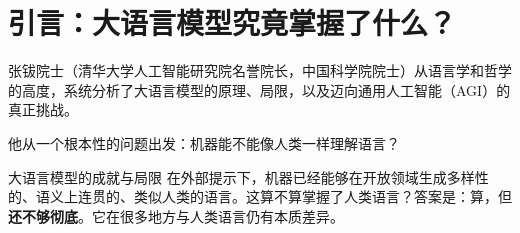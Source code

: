 \section{引言：大语言模型究竟掌握了什么？}

张钹院士（清华大学人工智能研究院名誉院长，中国科学院院士）从语言学和哲学的高度，系统分析了大语言模型的原理、局限，以及迈向通用人工智能（AGI）的真正挑战。

他从一个根本性的问题出发：机器能不能像人类一样理解语言？

\begin{importantbox}{大语言模型的成就与局限}
在外部提示下，机器已经能够在开放领域生成多样性的、语义上连贯的、类似人类的语言。这算不算掌握了人类语言？答案是：算，但\textbf{还不够彻底}。它在很多地方与人类语言仍有本质差异。
\end{importantbox}


